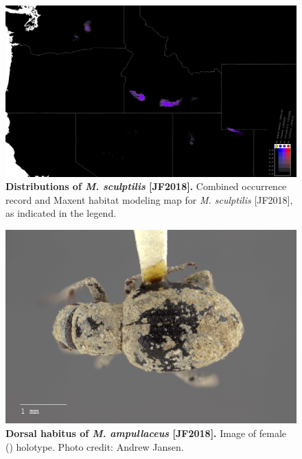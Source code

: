 \documentclass[fleqn,10pt,lineno]{wlpeerj} %
\begin{document}
\begin{figure}[h]
	\centering
	\begin{sideways}
		\includegraphics[height=0.85\textwidth]{figure7.png}
		\end{sideways}
	\caption{\textbf{Distributions of \textit{M. sculptilis} [JF2018].} Combined occurrence record and Maxent habitat modeling map for \textit{M. sculptilis} [JF2018], as indicated in the legend.}
	\label{fig:map_sculptilis}
\end{figure}

\begin{figure}[h]
	\begin{sideways}
		\centering
		\includegraphics[height=\textwidth]{figure8.jpg}
	\end{sideways}
	\caption{\textbf{Dorsal habitus of \textit{M. ampullaceus} [JF2018].} Image of female (\female) holotype. Photo credit: Andrew Jansen.}
	\label{fig:ampullaceus_F_dorsal}
\end{figure}
\end{document}
